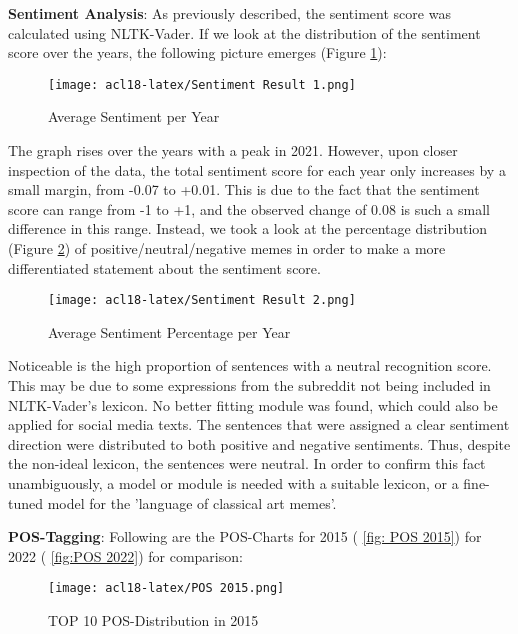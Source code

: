 \documentclass[11pt,a4paper]{article}
\begin{document}
 \par
 \textbf{Sentiment Analysis}: As previously described, the sentiment score was calculated using NLTK-Vader. If we look at the distribution of the sentiment score over the years, the following picture emerges (Figure \ref{fig:Figure Average Sentiment}):
 \begin{figure}[H]
    \centering
    \texttt{[image: acl18-latex/Sentiment Result 1.png]}
    \caption{Average Sentiment per Year}
    \label{fig:Figure Average Sentiment}
\end{figure}
\vspace{-0.4cm}
The graph rises over the years with a peak in 2021. However, upon closer inspection of the data, the total sentiment score for each year only increases by a small margin, from -0.07 to +0.01. This is due to the fact that the sentiment score can range from -1 to +1, and the observed change of 0.08 is such a small difference in this range. Instead, we took a look at the percentage distribution (Figure \ref{fig: Average Sentiment Percentagel})  of positive/neutral/negative memes in order to make a more differentiated statement about the sentiment score.
\begin{figure}[H]
    \centering
    \texttt{[image: acl18-latex/Sentiment Result 2.png]}
    \caption{Average Sentiment Percentage per Year}
    \label{fig: Average Sentiment Percentagel}
\end{figure}
Noticeable is the high proportion of sentences with a neutral recognition score. This may be due to some expressions from the subreddit not being included in NLTK-Vader's lexicon. No better fitting module was found, which could also be applied for social media texts. The sentences that were assigned a clear sentiment direction were distributed to both positive and negative sentiments. Thus, despite the non-ideal lexicon, the sentences were neutral. In order to confirm this fact unambiguously, a model or module is needed with a suitable lexicon, or a fine-tuned model for the 'language of classical art memes'.
\par\textbf{POS-Tagging}:
 Following are the POS-Charts for 2015 ( \autoref{fig: POS 2015}) for 2022 ( \autoref{fig:POS 2022}) for comparison:
 \begin{figure}[H]
    \centering
    \texttt{[image: acl18-latex/POS 2015.png]}
    \caption{TOP 10 POS-Distribution in 2015}
    \label{fig: POS 2015}
\end{figure}
 
\end{document}
